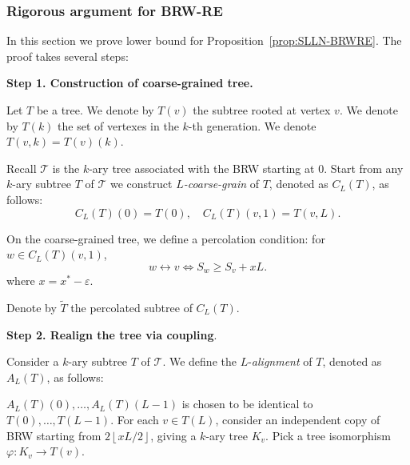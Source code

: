 
\subsubsection{Rigorous argument for BRW-RE}

In this section we prove lower bound for Proposition~\ref{prop:SLLN-BRWRE}. The proof takes several steps:

\textbf{Step 1. Construction of coarse-grained tree.}


Let $T$ be a tree. We denote by $T(v)$ the subtree rooted at vertex $v$. We denote by $T(k)$ the set of vertexes in the $k$-th generation. We denote $T(v, k) = T(v)(k)$.

Recall $\mathcal{T}$ is the $k$-ary tree associated with the BRW starting at $0$. Start from any $k$-ary subtree $T$ of $\mathcal{T}$ we construct $L$\textit{-coarse-grain} of $T$, denoted as $C_L(T)$, as follows:
\[
	C_L(T)(0) = T(0), \quad C_L(T)(v, 1) = T(v, L)
.\] 

On the coarse-grained tree, we define a percolation condition: for $w \in C_L(T)(v, 1)$,
\[
	w \leftrightarrow v \iff  S_w \ge S_v + x L
.\] 
where $x = x^* - \varepsilon$.

Denote by $\tilde T$ the percolated subtree of $C_L(T)$.



\textbf{Step 2. Realign the tree via coupling}. 

Consider a $k$-ary subtree $T$ of $\mathcal{T}$. We define the $L$-\textit{alignment} of $T$, denoted as $A_L(T)$, as follows:

$A_L(T)(0), \ldots, A_L(T)(L - 1)$ is chosen to be identical to $T(0), \ldots, T(L - 1)$. For each $v \in T(L)$, consider an independent copy of BRW starting from $2 \left\lfloor x L / 2 \right\rfloor$, giving a $k$-ary tree $K_v$. Pick a tree isomorphism $\varphi: K_v \to  T(v)$.

